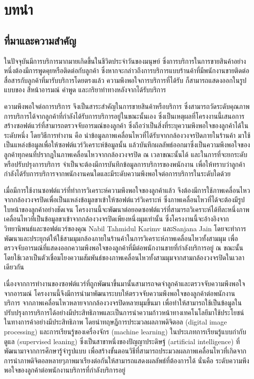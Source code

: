 \chapter{บทนำ}
\label{intro}
%
\section{ที่มาและความสำคัญ}
ในปัจจุบันมีการบริการมากมายเกิดขึ้นในชีวิตประจำวันของมนุษย์ ซึ่งการบริการในการขายสินค้าอย่างหนึ่งต้องมีการพูดคุยหรือติดต่อกับลูกค้า ซึ่งหากจะกล่าวถึงการบริการแบบร้านค้าที่มีพนักงานขายติดต่อสื่อสารกับลูกค้าที่มารับบริการโดยตรงแล้ว ความพึงพอใจการบริการที่ได้รับ ก็สามารถแสดงออกในรูปแบบของ สีหน้าอารมณ์ คำพูด และกริยาท่าทางหลังจากได้รับบริการ

ความพึงพอใจต่อการบริการ จึงเป็นสาระสำคัญในการขายสินค้าหรือบริการ ซึ่งสามารถวัดระดับคุณภาพการบริการได้จากลูกค้าที่กำลังได้รับการบริการอยู่ในขณะนั้นเอง  ซึ่งเป็นเหตุผลที่โครงงานนี้เสนอการสร้างซอฟต์แวร์ที่สามารถตรวจจับอารมณ์ของลูกค้า ซึ่งถือว่าเป็นสิ่งที่ระบุความพึงพอใจของลูกค้าได้ในระดับหนึ่ง โดยวิธีการทำงาน คือ นำข้อมูลภาพเคลื่อนไหวที่ได้รับจากกล้องวงจรปิดภายในร้านค้า มาใช้เป็นแหล่งข้อมูลเพื่อให้ซอฟต์แวร์วิเคราะห์ข้อมูลนั้น แล้วบันทึกผลลัพธ์ออกมาซึ่งเป็นความพึงพอใจของลูกค้าทุกคนที่ปรากฎในภาพเคลื่อนไหวจากกล้องวงจรปิด ณ เวลาขณะนั้นได้  และในการที่จะยกระดับหรือปรับปรุงการบริการ จำเป็นจะต้องมีการบันทึกข้อมูลการบริการของพนักงาน เพื่อให้ทราบว่าลูกค้ากำลังได้รับการบริการจากพนักงานคนใดและมีระดับความพึงพอใจต่อการบริการในระดับใดด้วย

เมื่อมีการใช้งานซอฟต์แวร์ที่ทำการวิเคราะห์ความพึงพอใจของลูกค้าแล้ว จึงต้องมีการใช้ภาพเคลื่อนไหวจากกล้องวงจรปิดเพื่อเป็นแหล่งข้อมูลขาเข้าให้ซอฟต์แวร์วิเคราะห์ ซึ่งภาพเคลื่อนไหวที่ได้จะต้องมีรูปใบหน้าของลูกค้าอย่างชัดเจน โครงงานนี้จะพัฒนาต่อยอดซอฟต์แวร์ที่สามารถวิเคราะห์ได้ทีละหนึ่งภาพเคลื่อนไหวที่เป็นข้อมูลขาเข้าจากกล้องวงจรปิดเพียงหนึ่งมุมเท่านั้น ซึ่งโครงงานนี้จะอ้างอิงจากวิทยานิพนธ์และซอฟต์แวร์ของคุณ Nabil Tahmidul Karimv \cite{nabil} และSanjana Jain \cite{sanjana} โดยจะทำการพัฒนาและประยุกต์ให้ใช้สามมุมกล้องภายในร้านค้าในการวิเคราะห์ภาพเคลื่อนไหวทั้งสามมุม เพื่อตรวจจับอารมณ์ที่แสดงออกความพึงพอใจของลูกค้าที่มีต่อพนักงานขายที่กำลังบริการอยู่ ณ ขณะนั้น โดยใช้เวลาเป็นตัวเชื่อมโยงความสัมพันธ์ของภาพเคลื่อนไหวทั้งสามมุมจากสามกล้องวงจรปิดในเวลาเดียวกัน

เนื่องจากการทำงานของซอฟต์แวร์ที่ถูกพัฒนาขึ้นมานั้นสามารถจดจำลูกค้าและตรวจจับความพึงพอใจจากอารมณ์ โครงงานนี้จึงมีการนำมาพัฒนาระบบให้ตรวจจับความพึงพอใจของลูกค้าต่อพนักงานบริการ จากภาพเคลื่อนไหวหลายจากกล้องวงจรปิดหลายมุมขึ้นมา เพื่อทำให้สามารถใช้เป็นข้อมูลในปรับปรุงการบริการได้อย่างมีประสิทธิภาพและเป็นการนำความก้าวหน้าทางเทคโนโลยีมาใช้ประโยชน์ในทางการค้าอย่างมีประสิทธิภาพ โดยนำทฤษฎีการประมวลผลภาพดิจิตอล (digital image processing)  และการเรียนรู้ของเครื่องจักร (machine learning)  ในประเภทการเรียนรู้แบบกำกับดูแล (supervised leaning)  ซึ่งเป็นสาขาหนึ่งของปัญญาประดิษฐ์ (artificial intelligence)  ที่พัฒนามาจากการศึกษารู้จำรูปแบบ เพื่อสร้างขั้นตอนวิธีที่สามารถประมวลผลภาพเคลื่อนไหวที่เกิดจากการนำภาพดิจิตอลหลายๆภาพมาเรียงต่อกันให้สามารถแสดงผลลัพธ์ที่ต้องการได้ นั่นคือ  ระดับความพึงพอใจของลูกค้าต่อพนักงานบริการที่กำลังบริการอยู่
 
